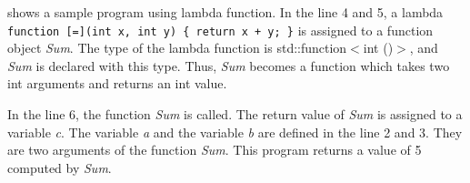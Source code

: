  shows a sample program using lambda function.
In the line 4 and 5,
a lambda \texttt{function [=](int x, int y) \{ return x + y; \}} is
assigned to a function object \textit{Sum}.
The type of the lambda function is std::function$<$int ()$>$,
and \textit{Sum} is declared with this type.
Thus, \textit{Sum} becomes a function which takes two int arguments
and returns an int value.

In the line 6, the function \textit{Sum} is called.
The return value of \textit{Sum} is assigned to a variable \textit{c}.
The variable \textit{a} and the variable \textit{b}
are defined in the line 2 and 3.
They are two arguments of the function \textit{Sum}.
This program returns a value of 5 computed by \textit{Sum}.
